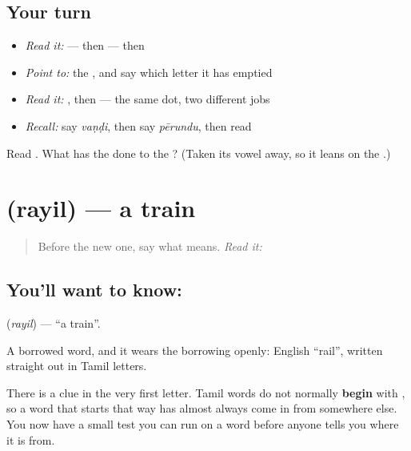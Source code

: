 \subsection*{Your turn}
\begin{itemize}
\raggedright
  \item \emph{Read it:} \textbf{} — then \textbf{} — then \textbf{}
  \item \emph{Point to:} the , and say which letter it has emptied
  \item \emph{Read it:} \textbf{}, then \textbf{} — the same dot, two different jobs
  \item \emph{Recall:} say \emph{vaṇḍi}, then say \emph{pērundu}, then read \textbf{}
\end{itemize}

\begin{tcolorbox}[breakable,colback=teal!4,colframe=teal!35!black,title={Before you move on}]
Read \textbf{}. What has the  done to the ? (Taken its vowel away, so it leans on the .)
\end{tcolorbox}
\section[\texorpdfstring{\ta{ரயில்} (rayil)}{ரயில் (rayil)}]{ (rayil) — a train}

\label{lesson:TA-C69-train}



\begin{quote}
Before the new one, say what \textbf{} means. \emph{Read it:} \textbf{}
\end{quote}

\subsection*{You'll want to know: }
\textbf{} (\emph{rayil}) — \textquotedblleft{}a train\textquotedblright{}.

A borrowed word, and it wears the borrowing openly: English \textquotedblleft{}rail\textquotedblright{}, written straight out in Tamil letters.

There is a clue in the very first letter. Tamil words do not normally \textbf{begin} with , so a word that starts that way has almost always come in from somewhere else. You now have a small test you can run on a word before anyone tells you where it is from.

